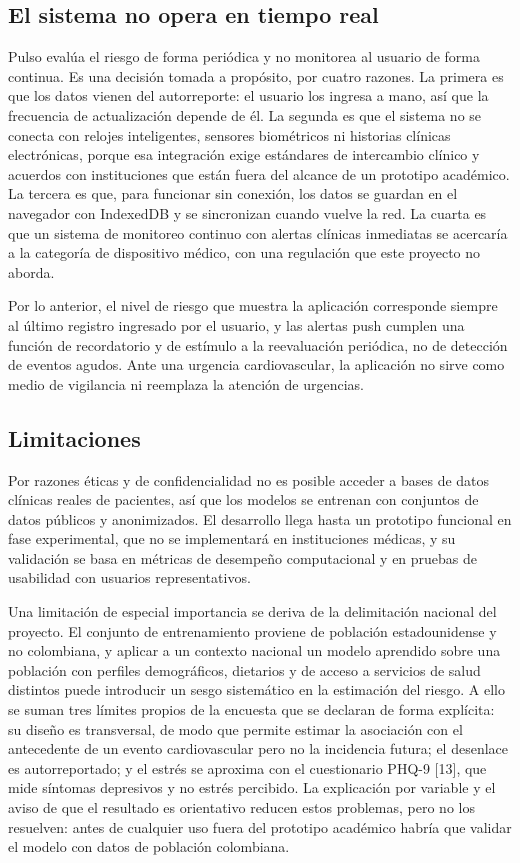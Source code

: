 \documentclass[conference]{IEEEtran}
\begin{document}
\subsection{El sistema no opera en tiempo real}
Pulso evalúa el riesgo de forma periódica y no monitorea al usuario de forma continua. Es una decisión tomada a propósito, por cuatro razones. La primera es que los datos vienen del autorreporte: el usuario los ingresa a mano, así que la frecuencia de actualización depende de él. La segunda es que el sistema no se conecta con relojes inteligentes, sensores biométricos ni historias clínicas electrónicas, porque esa integración exige estándares de intercambio clínico y acuerdos con instituciones que están fuera del alcance de un prototipo académico. La tercera es que, para funcionar sin conexión, los datos se guardan en el navegador con IndexedDB y se sincronizan cuando vuelve la red. La cuarta es que un sistema de monitoreo continuo con alertas clínicas inmediatas se acercaría a la categoría de dispositivo médico, con una regulación que este proyecto no aborda.

Por lo anterior, el nivel de riesgo que muestra la aplicación corresponde siempre al último registro ingresado por el usuario, y las alertas push cumplen una función de recordatorio y de estímulo a la reevaluación periódica, no de detección de eventos agudos. Ante una urgencia cardiovascular, la aplicación no sirve como medio de vigilancia ni reemplaza la atención de urgencias.

\subsection{Limitaciones}
Por razones éticas y de confidencialidad no es posible acceder a bases de datos clínicas reales de pacientes, así que los modelos se entrenan con conjuntos de datos públicos y anonimizados. El desarrollo llega hasta un prototipo funcional en fase experimental, que no se implementará en instituciones médicas, y su validación se basa en métricas de desempeño computacional y en pruebas de usabilidad con usuarios representativos.

Una limitación de especial importancia se deriva de la delimitación nacional del proyecto. El conjunto de entrenamiento proviene de población estadounidense y no colombiana, y aplicar a un contexto nacional un modelo aprendido sobre una población con perfiles demográficos, dietarios y de acceso a servicios de salud distintos puede introducir un sesgo sistemático en la estimación del riesgo. A ello se suman tres límites propios de la encuesta que se declaran de forma explícita: su diseño es transversal, de modo que permite estimar la asociación con el antecedente de un evento cardiovascular pero no la incidencia futura; el desenlace es autorreportado; y el estrés se aproxima con el cuestionario PHQ-9 [13], que mide síntomas depresivos y no estrés percibido. La explicación por variable y el aviso de que el resultado es orientativo reducen estos problemas, pero no los resuelven: antes de cualquier uso fuera del prototipo académico habría que validar el modelo con datos de población colombiana.
\end{document}

